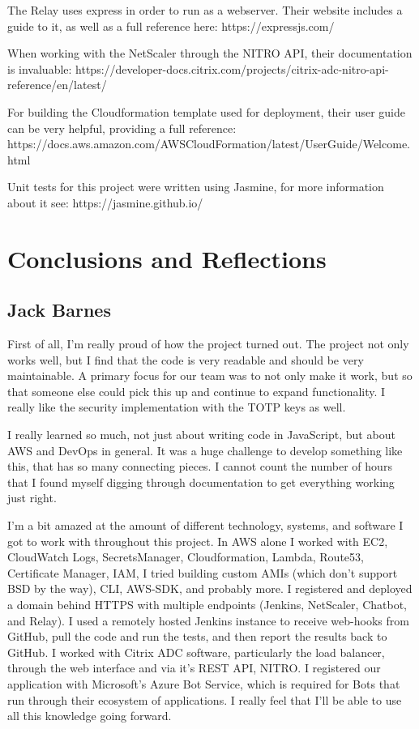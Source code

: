 \documentclass[onecolumn, draftclsnofoot,10pt, compsoc]{IEEEtran}
\begin{document}
    The Relay uses express in order to run as a webserver.
    Their website includes a guide to it, as well as a full reference here: https://expressjs.com/
    
    When working with the NetScaler through the NITRO API, their documentation is invaluable: https://developer-docs.citrix.com/projects/citrix-adc-nitro-api-reference/en/latest/
    
    For building the Cloudformation template used for deployment, their user guide can be very helpful, providing a full reference: https://docs.aws.amazon.com/AWSCloudFormation/latest/UserGuide/Welcome.html
    
    Unit tests for this project were written using Jasmine, for more information about it see: https://jasmine.github.io/


\section{Conclusions and Reflections}
\subsection{Jack Barnes}
    First of all, I'm really proud of how the project turned out.
    The project not only works well, but I find that the code is very readable and should be very maintainable.
    A primary focus for our team was to not only make it work, but so that someone else could pick this up and continue to expand functionality.
    I really like the security implementation with the TOTP keys as well.
    
    I really learned so much, not just about writing code in JavaScript, but about AWS and DevOps in general.
    It was a huge challenge to develop something like this, that has so many connecting pieces.
    I cannot count the number of hours that I found myself digging through documentation to get everything working just right.
    
    I'm a bit amazed at the amount of different technology, systems, and software I got to work with throughout this project.
    In AWS alone I worked with EC2, CloudWatch Logs, SecretsManager, Cloudformation, Lambda, Route53, Certificate Manager, IAM, I tried building custom AMIs (which don't support BSD by the way), CLI, AWS-SDK, and probably more.
    I registered and deployed a domain behind HTTPS with multiple endpoints (Jenkins, NetScaler, Chatbot, and Relay).
    I used a remotely hosted Jenkins instance to receive web-hooks from GitHub, pull the code and run the tests, and then report the results back to GitHub.
    I worked with Citrix ADC software, particularly the load balancer, through the web interface and via it's REST API, NITRO.
    I registered our application with Microsoft's Azure Bot Service, which is required for Bots that run through their ecosystem of applications.
    I really feel that I'll be able to use all this knowledge going forward.
    
\end{document}
